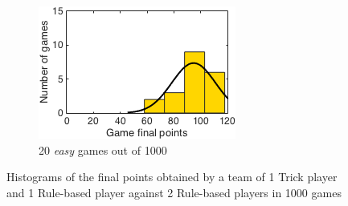 \begin{figure}[h]
\begin{subfigure}[h]{0.32\textwidth}
                \includegraphics[width=\textwidth]{./img/appendix/histDeasy}
                \caption{20 \emph{easy} games out of 1000}
                \label{app:histDeasy}
        \end{subfigure}
        \caption[Histograms of the final points obtained in scenario (d) for \emph{hard}, \emph{medium} and \emph{easy} hands]{Histograms of the final points obtained by a team of 1 Trick player and 1 Rule-based player against 2 Rule-based players in 1000 games}
        \label{app:histogramsD}
\end{figure}

